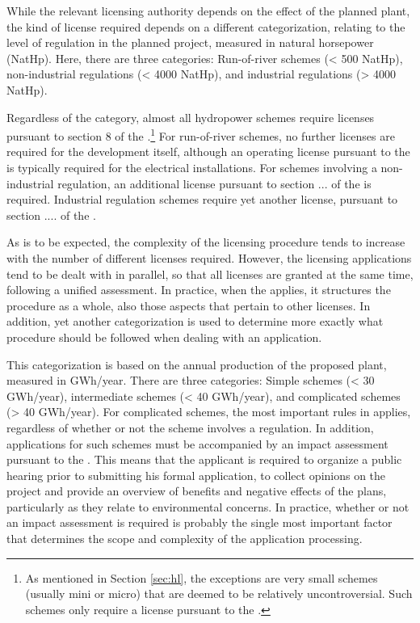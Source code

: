 While the relevant licensing authority depends on the effect of the planned plant, the kind of license required depends on a different categorization, relating to the level of regulation in the planned project, measured in natural horsepower (NatHp). Here, there are three categories: Run-of-river schemes  (< 500 NatHp), non-industrial regulations (< 4000 NatHp), and industrial regulations (> 4000 NatHp). %

Regardless of the category, almost all hydropower schemes require licenses pursuant to section 8 of the \cite{wra00}.\footnote{As mentioned in Section \ref{sec:hl}, the exceptions are very small schemes (usually mini or micro) that are deemed to be relatively uncontroversial. Such schemes only require a license pursuant to the \cite{pbl...}.} For run-of-river schemes, no further licenses are required for the development itself, although an operating license pursuant to the \cite{ea90} is typically required for the electrical installations. For schemes involving a non-industrial regulation, an additional license pursuant to section ... of the \cite{wra17} is required. Industrial regulation schemes require yet another license, pursuant to section .... of the \cite{ica17}. 

As is to be expected, the complexity of the licensing procedure tends to increase with the number of different licenses required. However, the licensing applications tend to be dealt with in parallel, so that all licenses are granted at the same time, following a unified assessment. In practice, when the \cite{wra17} applies, it structures the procedure as a whole, also those aspects that pertain to other licenses. In addition, yet another categorization is used to determine more exactly what procedure should be followed when dealing with an application.

This categorization is based on the annual production of the proposed plant, measured in GWh/year. There are three categories: Simple schemes (< 30 GWh/year), intermediate schemes (< 40 GWh/year), and complicated schemes (> 40 GWh/year). For complicated schemes, the most important rules in \cite{wra17} applies, regardless of whether or not the scheme involves a regulation. In addition, applications for such schemes must be accompanied by an impact assessment pursuant to the \cite{pbl..}. This means that the applicant is required to organize a public hearing prior to submitting his formal application, to collect opinions on the project and provide an overview of benefits and negative effects of the plans, particularly as they relate to environmental concerns. In practice, whether or not an impact assessment is required is probably the single most important factor that determines the scope and complexity of the application processing. 

